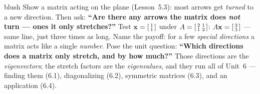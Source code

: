 \documentclass[10pt]{article}
\newcommand{\xx}{\mathbf{x}}
\begin{document}
\begin{skillbox}[Hook]{blush}
    Show a matrix acting on the plane (Lesson~5.3): most arrows get \emph{turned} to a new direction.
    Then ask: \textbf{``Are there any arrows the matrix does \emph{not} turn --- ones it only
    stretches?''} Test $\xx=\begin{bsmallmatrix}1\\1\end{bsmallmatrix}$ under
    $A=\begin{bsmallmatrix}2&1\\1&2\end{bsmallmatrix}$: $A\xx=\begin{bsmallmatrix}3\\3\end{bsmallmatrix}$
    --- same line, just three times as long. Name the payoff: for a few \emph{special directions} a
    matrix acts like a single \emph{number}. Pose the unit question: \textbf{``Which directions does a
    matrix only stretch, and by how much?''} Those directions are the \emph{eigenvectors}; the stretch
    factors are the \emph{eigenvalues}, and they run all of Unit~6 --- finding them (6.1), diagonalizing
    (6.2), symmetric matrices (6.3), and an application (6.4).
\end{skillbox}
\end{document}
